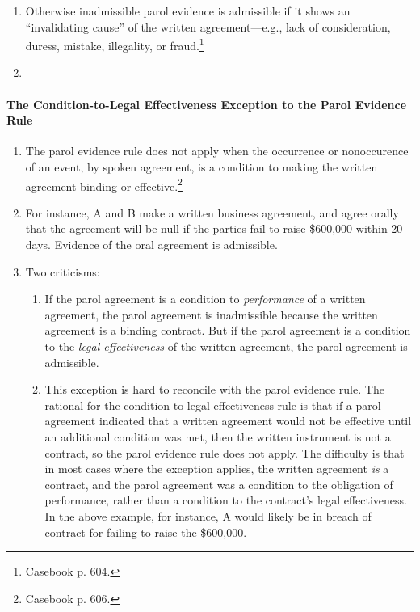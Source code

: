 \begin{enumerate}
    \item Otherwise inadmissible parol evidence is admissible if it shows an 
    ``invalidating cause'' of the written agreement---e.g., lack of 
    consideration, duress, mistake, illegality, or fraud.\footnote{Casebook p. 
    604.}
    \item %
\end{enumerate}

\paragraph{The Condition-to-Legal Effectiveness Exception to the Parol 
Evidence Rule}

\begin{enumerate}
    \item The parol evidence rule does not apply when the occurrence or 
    nonoccurence of an event, by spoken agreement, is a condition to making 
    the written agreement binding or effective.\footnote{Casebook p. 606.}
    \item For instance, A and B make a written business agreement, and agree 
    orally that the agreement will be null if the parties fail to raise 
    \$600,000 within 20 days. Evidence of the oral agreement is admissible.
    \item Two criticisms:
    \begin{enumerate}
        \item If the parol agreement is a condition to \emph{performance} of a 
        written agreement, the parol agreement is inadmissible because the 
        written agreement is a binding contract. But if the parol agreement is 
        a condition to the \emph{legal effectiveness} of the written 
        agreement, the parol agreement is admissible.
        \item This exception is hard to reconcile with the parol evidence 
        rule. The rational for the condition-to-legal effectiveness rule is 
        that if a parol agreement indicated that a written agreement would not 
        be effective until an additional condition was met, then the written 
        instrument is not a contract, so the parol evidence rule does not 
        apply. The difficulty is that in most cases where the exception 
        applies, the written agreement \emph{is} a contract, and the parol 
        agreement was a condition to the obligation of performance, rather 
        than a condition to the contract's legal effectiveness. In the above 
        example, for instance, A would likely be in breach of contract for 
        failing to raise the \$600,000.
    \end{enumerate}
\end{enumerate}

